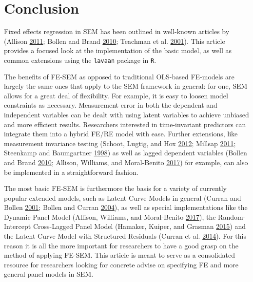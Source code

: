 \documentclass[
  12pt,
  a4paper]{article}
\begin{document}
\doublespacing

\hypertarget{conclusion}{%
\section{Conclusion}\label{conclusion}}

Fixed effects regression in SEM has been outlined in well-known articles
by (Allison \protect\hyperlink{ref-Allison2011}{2011}; Bollen and Brand
\protect\hyperlink{ref-Bollen2010}{2010}; Teachman et al.
\protect\hyperlink{ref-Teachman2001}{2001}). This article provides a
focused look at the implementation of the basic model, as well as common
extensions using the \texttt{lavaan} package in \texttt{R}.

The benefits of FE-SEM as opposed to traditional OLS-based FE-models are
largely the same ones that apply to the SEM framework in general: for
one, SEM allows for a great deal of flexibility. For example, it is easy
to loosen model constraints as necessary. Measurement error in both the
dependent and independent variables can be dealt with using latent
variables to achieve unbiased and more efficient results. Researchers
interested in time-invariant predictors can integrate them into a hybrid
FE/RE model with ease. Further extensions, like measurement invariance
testing (Schoot, Lugtig, and Hox
\protect\hyperlink{ref-Schoot2012}{2012}; Millsap
\protect\hyperlink{ref-Millsap2011}{2011}; Steenkamp and Baumgartner
\protect\hyperlink{ref-Steenkamp1998}{1998}) as well as lagged dependent
variables (Bollen and Brand \protect\hyperlink{ref-Bollen2010}{2010};
Allison, Williams, and Moral-Benito
\protect\hyperlink{ref-Allison2017}{2017}) for example, can also be
implemented in a straightforward fashion.

The most basic FE-SEM is furthermore the basis for a variety of
currently popular extended models, such as Latent Curve Models in
general (Curran and Bollen \protect\hyperlink{ref-Curran2001}{2001};
Bollen and Curran \protect\hyperlink{ref-Bollen2004}{2004}), as well as
special implementations like the Dynamic Panel Model (Allison, Williams,
and Moral-Benito \protect\hyperlink{ref-Allison2017}{2017}), the
Random-Intercept Cross-Lagged Panel Model (Hamaker, Kuiper, and Grasman
\protect\hyperlink{ref-Hamaker2015}{2015}) and the Latent Curve Model
with Structured Residuals (Curran et al.
\protect\hyperlink{ref-Curran2014}{2014}). For this reason it is all the
more important for researchers to have a good grasp on the method of
applying FE-SEM. This article is meant to serve as a consolidated
resource for researchers looking for concrete advise on specifying FE
and more general panel models in SEM.
\end{document}
